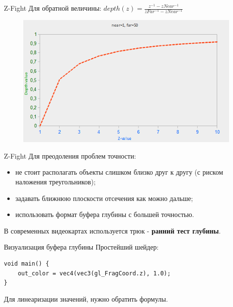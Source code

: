 \documentclass[aspectration=1610,t]{beamer}
\begin{document}
\begin{frame}[fragile]{Z-Fight}
    Для обратной величины:
    $depth(z) = \frac{z^{-1} - zNear^{-1}}{zFar^{-1} - zNear^{-1}}$
    \begin{figure}[htp]
        \centering
        \includegraphics[scale=0.50]{res/frac_lin_z}
    \end{figure}
\end{frame}

\begin{frame}[fragile]{Z-Fight}
    Для преодоления проблем точности:
    \begin{itemize}
        \item не стоит располагать объекты слишком близко друг к другу (с риском наложения треугольников);
        \item задавать ближнюю плоскости отсечения как можно дальше;
        \item использовать формат буфера глубины с большей точностью.
    \end{itemize}
    В современных видеокартах используется трюк - {\bf ранний тест глубины}.
\end{frame}

\begin{frame}[fragile]{Визуализация буфера глубины}
    Простейший шейдер:
    {\small \begin{lstlisting}
void main() {             
    out_color = vec4(vec3(gl_FragCoord.z), 1.0);
}
    \end{lstlisting}}
    Для линеаризации значений, нужно обратить формулы.
\end{frame}
\end{document}
